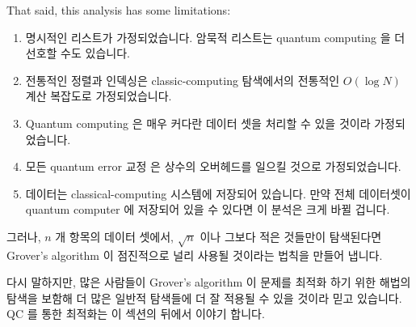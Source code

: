 That said, this analysis has some limitations:
\fi

\begin{enumerate}
\item	명시적인 리스트가 가정되었습니다.
	암묵적 리스트는 quantum computing 을 더 선호할 수도 있습니다.
\item	전통적인 정렬과 인덱싱은 classic-computing 탐색에서의 전통적인 $O(\log
	N)$ 계산 복잡도로 가정되었습니다.
\item	Quantum computing 은 매우 커다란 데이터 셋을 처리할 수 있을 것이라
	가정되었습니다.
\item	모든 quantum error 교정 은 상수의 오버헤드를 일으킬 것으로
	가정되었습니다.
\item	데이터는 classical-computing 시스템에 저장되어 있습니다.
	만약 전체 데이터셋이 quantum computer 에 저장되어 있을 수 있다면 이
	분석은 크게 바뀔 겁니다.

\end{enumerate}

그러나, $n$ 개 항목의 데이터 셋에서, $\sqrt n$ 이나 그보다 적은 것들만이
탐색된다면 Grover's algorithm 이 점진적으로 널리 사용될 것이라는 법칙을 만들어
냅니다.

다시 말하지만, 많은 사람들이 Grover's algorithm 이 문제를 최적화 하기 위한
해법의 탐색을 보함해 더 많은 일반적 탐색들에 더 잘 적용될 수 있을 것이라 믿고
있습니다.
QC 를 통한 최적화는 이 섹션의 뒤에서 이야기 합니다.


